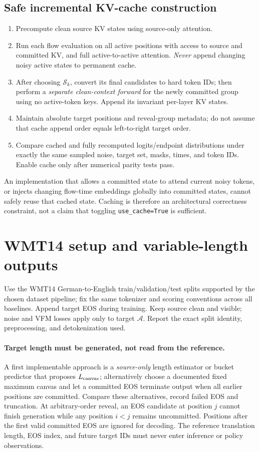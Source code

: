 \documentclass[11pt,a4paper]{article}
\newcommand{\A}{\mathcal A}
\newcommand{\Sset}{\mathcal S}
\begin{document}
\subsection{Safe incremental KV-cache construction}
\begin{enumerate}
\item Precompute clean source KV states using source-only attention.
\item Run each flow evaluation on all active positions with access to source and committed KV, and full active-to-active attention. \emph{Never} append changing noisy active states to permanent cache.
\item After choosing $\Sset_k$, convert its final candidates to hard token IDs; then perform a \emph{separate clean-context forward} for the newly committed group using no active-token keys. Append its invariant per-layer KV states.
\item Maintain absolute target positions and reveal-group metadata; do not assume that cache append order equals left-to-right target order.
\item Compare cached and fully recomputed logits/endpoint distributions under exactly the same sampled noise, target set, masks, times, and token IDs. Enable cache only after numerical parity tests pass.
\end{enumerate}
An implementation that allows a committed state to attend current noisy tokens, or injects changing flow-time embeddings globally into committed states, cannot safely reuse that cached state. Caching is therefore an architectural correctness constraint, not a claim that toggling \texttt{use\_cache=True} is sufficient.

\section{WMT14 setup and variable-length outputs}\label{sec:length}
Use the WMT14 German-to-English train/validation/test splits supported by the chosen dataset pipeline; fix the same tokenizer and scoring conventions across all baselines. Append target EOS during training. Keep source clean and visible; noise and VFM losses apply only to target $\A$. Report the exact split identity, preprocessing, and detokenization used.

\paragraph{Target length must be generated, not read from the reference.}
A first implementable approach is a \emph{source-only} length estimator or bucket predictor that proposes $L_{\rm canvas}$; alternatively choose a documented fixed maximum canvas and let a committed EOS terminate output when all earlier positions are committed. Compare these alternatives, record failed EOS and truncation. At arbitrary-order reveal, an EOS candidate at position $j$ cannot finish generation while any position $i<j$ remains uncommitted. Positions after the first valid committed EOS are ignored for decoding. The reference translation length, EOS index, and future target IDs must never enter inference or policy observations.
\end{document}
